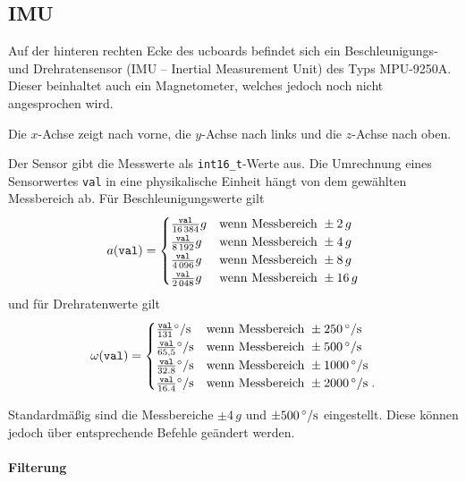 \subsection{IMU}

Auf der hinteren rechten Ecke des ucboards befindet sich ein Beschleunigungs- und Drehratensensor (IMU -- Inertial Measurement Unit) des Typs MPU-9250A. \textcolor[rgb]{0.75,0.75,0.75}{Dieser beinhaltet auch ein Magnetometer, welches jedoch noch nicht angesprochen wird.}

Die $x$-Achse zeigt nach vorne, die $y$-Achse nach links und die $z$-Achse nach oben.

Der Sensor gibt die Messwerte als \texttt{int16\_t}-Werte aus. Die Umrechnung eines Sensorwertes \texttt{val} in eine physikalische Einheit hängt von dem gewählten Messbereich ab. Für Beschleunigungswerte gilt
\begin{align*}
	a(\mathtt{val})
		=
			\begin{cases}
				\frac{\mathtt{val}}{16\,384} g & \textnormal{wenn Messbereich } \pm 2\,g \\
				\frac{\mathtt{val}}{8\,192} g & \textnormal{wenn Messbereich } \pm 4\,g \\
				\frac{\mathtt{val}}{4\,096} g & \textnormal{wenn Messbereich } \pm 8\,g \\
				\frac{\mathtt{val}}{2\,048} g & \textnormal{wenn Messbereich } \pm 16\,g 
			\end{cases}
\end{align*}
und für Drehratenwerte gilt
\begin{align*}
	\omega(\mathtt{val})
		=
			\begin{cases}
				\frac{\mathtt{val}}{131} \mrm{\degree / s} & \tn{wenn Messbereich } \pm \valunit{250}{\degree / s} \\
				\frac{\mathtt{val}}{65,5} \mrm{\degree / s} & \tn{wenn Messbereich } \pm \valunit{500}{\degree / s} \\
				\frac{\mathtt{val}}{32.8} \mrm{\degree / s} & \tn{wenn Messbereich } \pm \valunit{1000}{\degree / s} \\
				\frac{\mathtt{val}}{16.4} \mrm{\degree / s} & \tn{wenn Messbereich } \pm \valunit{2000}{\degree / s}\;.
			\end{cases}
\end{align*}

Standardmäßig sind die Messbereiche $\pm 4\,g$ und $\pm \valunit{500}{\degree / s}$ eingestellt. Diese können jedoch über entsprechende Befehle geändert werden.


\paragraph{Filterung}

